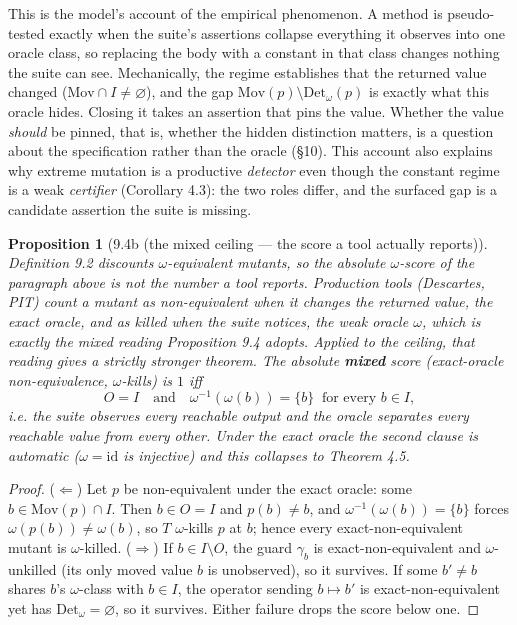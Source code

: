 \documentclass[conference]{IEEEtran}
\newcommand{\Mov}{\mathrm{Mov}}
\newcommand{\Det}{\mathrm{Det}}
\theoremstyle{run}
\newtheorem*{proposition}{Proposition}
\begin{document}
This is the model's account of the empirical phenomenon. A method is pseudo-tested exactly when the suite's assertions collapse everything it observes into one oracle class, so replacing the body with a constant in that class changes nothing the suite can see. Mechanically, the regime establishes that the returned value changed ($\Mov \cap I \neq \varnothing$), and the gap $\Mov(p) \setminus \Det_\omega(p)$ is exactly what this oracle hides. Closing it takes an assertion that pins the value. Whether the value \emph{should} be pinned, that is, whether the hidden distinction matters, is a question about the specification rather than the oracle (\S 10). This account also explains why extreme mutation is a productive \emph{detector} even though the constant regime is a weak \emph{certifier} (Corollary 4.3): the two roles differ, and the surfaced gap is a candidate assertion the suite is missing.

\begin{proposition}[9.4b (the mixed ceiling --- the score a tool actually reports)]
Definition 9.2 discounts $\omega$-equivalent mutants, so the absolute $\omega$-score of the paragraph above is not the number a tool reports. Production tools (Descartes, PIT) count a mutant as non-equivalent when it changes the returned value, the \emph{exact} oracle, and as killed when the suite notices, the \emph{weak} oracle $\omega$, which is exactly the mixed reading Proposition 9.4 adopts. Applied to the ceiling, that reading gives a strictly stronger theorem. The absolute \textbf{mixed} score (exact-oracle non-equivalence, $\omega$-kills) is $1$ iff \[ O = I \quad\text{and}\quad \omega^{-1}(\omega(b)) = \{b\}\ \text{ for every } b \in I, \] i.e. the suite observes every reachable output \emph{and} the oracle separates every reachable value from every other. Under the exact oracle the second clause is automatic ($\omega = \mathrm{id}$ is injective) and this collapses to Theorem 4.5.
\end{proposition}

\begin{proof}
($\Leftarrow$) Let $p$ be non-equivalent under the exact oracle: some $b \in \Mov(p) \cap I$. Then $b \in O = I$ and $p(b) \neq b$, and $\omega^{-1}(\omega(b)) = \{b\}$ forces $\omega(p(b)) \neq \omega(b)$, so $T$ $\omega$-kills $p$ at $b$; hence every exact-non-equivalent mutant is $\omega$-killed. ($\Rightarrow$) If $b \in I \setminus O$, the guard $\gamma_b$ is exact-non-equivalent and $\omega$-unkilled (its only moved value $b$ is unobserved), so it survives. If some $b' \neq b$ shares $b$'s $\omega$-class with $b \in I$, the operator sending $b \mapsto b'$ is exact-non-equivalent yet has $\Det_\omega = \varnothing$, so it survives. Either failure drops the score below one.
\end{proof}
\end{document}
